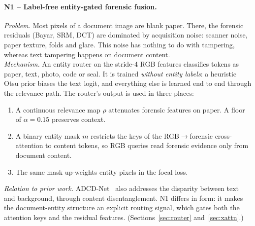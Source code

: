 \documentclass[10pt,a4paper]{article}
\begin{document}
\paragraph{N1 -- Label-free entity-gated forensic fusion.}
\emph{Problem.} Most pixels of a document image are blank paper. There, the forensic
residuals (Bayar, SRM, DCT) are dominated by acquisition noise: scanner noise, paper
texture, folds and glare. This noise has nothing to do with tampering, whereas text
tampering happens on document content.\\
\emph{Mechanism.} An entity router on the stride-4 RGB features classifies tokens as paper,
text, photo, code or seal. It is trained \emph{without entity labels}: a heuristic Otsu
prior biases the text logit, and everything else is learned end to end through the
relevance path. The router's output is used in three places:
\begin{enumerate}[label=(\alph*)]
  \item A continuous relevance map $\rho$ attenuates forensic features on paper. A floor of
        $\alpha=0.15$ preserves context.
  \item A binary entity mask $m$ restricts the keys of the RGB$\rightarrow$forensic
        cross-attention to content tokens, so RGB queries read forensic evidence only from
        document content.
  \item The same mask up-weights entity pixels in the focal loss.
\end{enumerate}
\emph{Relation to prior work.} ADCD-Net~\cite{adcd} also addresses the disparity between
text and background, through content disentanglement. N1 differs in form: it makes the
document-entity structure an explicit routing signal, which gates both the attention keys
and the residual features.
(Sections~\ref{sec:router} and~\ref{sec:xattn}.)
\end{document}
